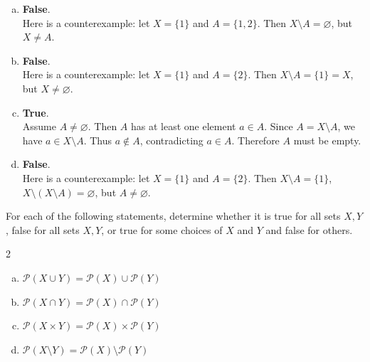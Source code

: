 \begin{mysolution}
    \begin{enumerate}[(a)]
    \item \textbf{False}.\\
    Here is a counterexample: let $X = \{1\}$ and $A = \{1, 2\}$. Then $X \setminus A = \varnothing$, but $X \ne A$.
    \item \textbf{False}.\\
    Here is a counterexample: let $X = \{1\}$ and $A = \{2\}$. Then $X \setminus A = \{1\} = X$, but $X \ne \varnothing$.
    \item \textbf{True}.\\
    Assume $A \ne \varnothing$. Then $A$ has at least one element $a \in A$. Since $A = X \setminus A$, we have $a \in X \setminus A$. Thus $a \notin A$, contradicting $a \in A$. Therefore $A$ must be empty.
    \item \textbf{False}.\\
    Here is a counterexample: let $X = \{1\}$ and $A = \{2\}$. Then $X \setminus A = \{1\}$, $X \setminus (X \setminus A) = \varnothing$, but $A \ne \varnothing$.
    \end{enumerate}
\end{mysolution}

\begin{chapex}
\label{cqPowerSetRespectSetOperations}
For each of the following statements, determine whether it is true for all sets $X,Y$, false for all sets $X,Y$, or true for some choices of $X$ and $Y$ and false for others.
\begin{multicols}{2}
\begin{enumerate}[(a)]
    \item $\mathcal{P}(X \cup Y) = \mathcal{P}(X) \cup \mathcal{P}(Y)$
    \item $\mathcal{P}(X \cap Y) = \mathcal{P}(X) \cap \mathcal{P}(Y)$
    \item $\mathcal{P}(X \times Y) = \mathcal{P}(X) \times \mathcal{P}(Y)$
    \item $\mathcal{P}(X \setminus Y) = \mathcal{P}(X) \setminus \mathcal{P}(Y)$
\end{enumerate}
\end{multicols}
\end{chapex}

